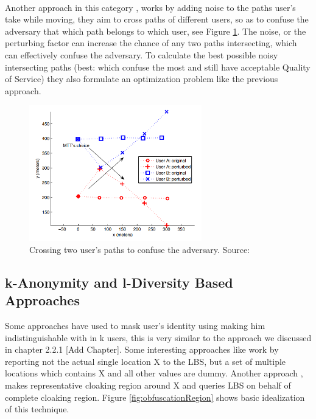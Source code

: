 \documentclass{report}
\begin{document}
\paragraph{}
Another approach in this category \cite{hoh2005protecting}, works by adding noise to the paths user's take while moving, they aim to cross paths of different users, so as to confuse the adversary that which path belongs to which user, see Figure \ref{fig:pathConfusion}. The noise, or the perturbing factor can increase the chance of any two paths intersecting, which can effectively confuse the adversary. To calculate the best possible noisy intersecting paths (best: which confuse the most and still have acceptable Quality of Service) they also formulate an optimization problem like the previous approach. 
\begin{figure}[ht]
\centering
        \includegraphics[width=75mm,scale=0.5]{Images/PathConfusion.PNG}
    \caption{Crossing two user's paths to confuse the adversary. Source:\cite{hoh2005protecting}}
    \label{fig:pathConfusion}
\end{figure}

\subsection{k-Anonymity and l-Diversity Based Approaches}
Some approaches have used to mask user's identity using making him indistinguishable with in k users, this is very similar to the approach we discussed in chapter 2.2.1 [Add Chapter]. Some interesting approaches like \cite{kido2005protection} work by reporting not the actual single location X to the LBS, but a set of multiple locations which contains X and all other values are dummy. Another approach \cite{duckham2005formal}, makes representative cloaking region around X and queries LBS on behalf of complete cloaking region. Figure \ref{fig:obfuscationRegion} shows basic idealization of this technique.
\end{document}
